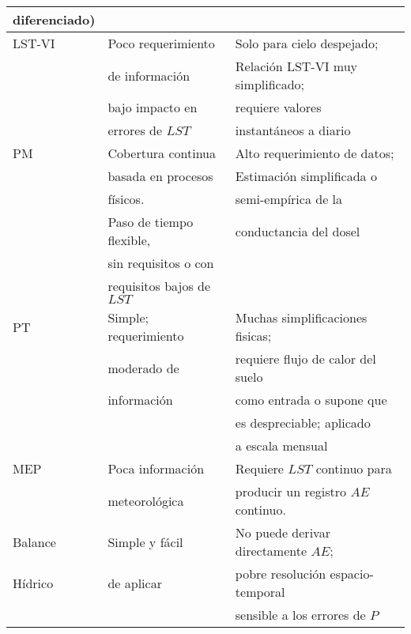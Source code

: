 \begin{longtable}{l|l|l}
diferenciado)   &                          &                                     \\ \hline
LST-VI          & Poco requerimiento      & Solo  para cielo despejado;         \\
                & de información           & Relación LST-VI muy simplificado;   \\
                & bajo impacto en          &   requiere valores                  \\
                & errores de $LST$         & instantáneos a diario     \\ \hline
PM              & Cobertura continua       & Alto requerimiento de datos;          \\
                & basada en procesos       & Estimación simplificada o           \\
                & físicos.                  & semi-empírica de la                 \\
                & Paso de tiempo flexible, & conductancia del dosel              \\
                & sin requisitos o con     &                                     \\
                & requisitos bajos de $LST$  &                                     \\ \hline
PT              & Simple; requerimiento    & Muchas simplificaciones fisicas;     \\
                & moderado de              & requiere flujo de calor del suelo   \\
                & información              & como entrada o supone que           \\
                &                          & es despreciable; aplicado             \\ 
                &                          & a escala mensual                    \\ \hline
MEP             & Poca información         & Requiere $LST$ continuo para            \\
                & meteorológica            & producir un registro $AE$ continuo.     \\ \hline
Balance         & Simple y fácil           & No puede derivar directamente $AE$;    \\
Hídrico         & de aplicar               & pobre resolución espacio-temporal   \\
                &                          & sensible a los errores de $P$         \\ \hline

\end{longtable}
